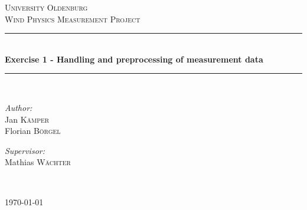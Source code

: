 \begin{titlepage}
\begin{center}


\textsc{\LARGE University Oldenburg}\\[1.5cm]

\textsc{\Large Wind Physics Measurement Project}\\[0.5cm]


\newcommand{\HRule}{\rule{\linewidth}{0.5mm}}
\HRule \\[0.4cm]
{ \huge \bfseries Exercise 1 - Handling and preprocessing of measurement data}\\[0.4cm]

\HRule \\[1.5cm]

\begin{minipage}{0.4\textwidth}
\begin{flushleft} \large
\emph{Author:}\\
Jan \textsc{K\"amper}\\
Florian \textsc{B\"orgel}
\end{flushleft}
\end{minipage}
\hfill
\begin{minipage}{0.4\textwidth}
\begin{flushright} \large
\emph{Supervisor:} \\
Mathias \textsc{Wächter}
\end{flushright}
\end{minipage}
\\[3cm]
\vfill



{\large \today}

\end{center}

\end{titlepage}